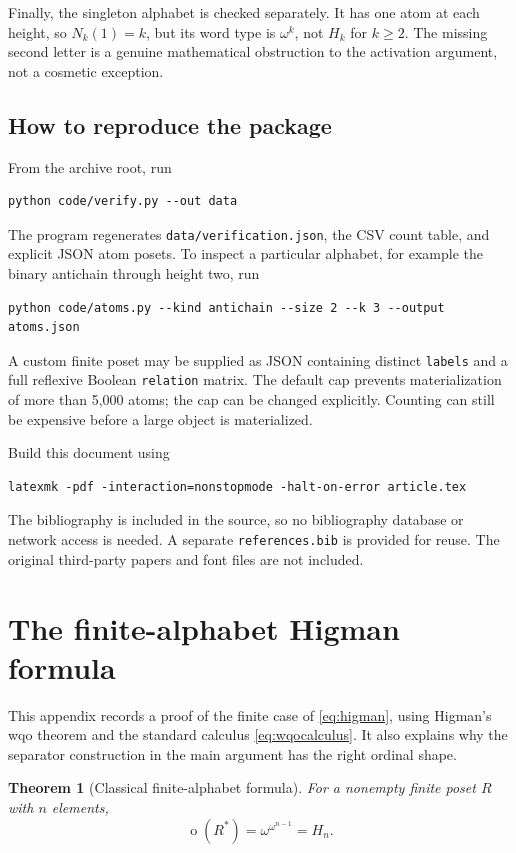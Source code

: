 \documentclass[11pt,letterpaper]{article}
\newtheorem{theorem}{Theorem}[section]
\theoremstyle{definition}
\theoremstyle{remark}
\newcommand{\otp}{\operatorname{o}}
\begin{document}
Finally, the singleton alphabet is checked separately. It has one atom
at each height, so $N_k(1)=k$, but its word type is $\omega^k$, not
$H_k$ for $k\ge2$. The missing second letter is a genuine mathematical
obstruction to the activation argument, not a cosmetic exception.

\subsection{How to reproduce the package}

From the archive root, run
\begin{lstlisting}
python code/verify.py --out data
\end{lstlisting}
The program regenerates \texttt{data/verification.json}, the CSV count
table, and explicit JSON atom posets. To inspect a particular alphabet,
for example the binary antichain through height two, run
\begin{lstlisting}
python code/atoms.py --kind antichain --size 2 --k 3 --output atoms.json
\end{lstlisting}
A custom finite poset may be supplied as JSON containing distinct
\texttt{labels} and a full reflexive Boolean \texttt{relation} matrix.
The default cap prevents materialization of more than 5,000 atoms; the
cap can be changed explicitly. Counting can still be expensive before
a large object is materialized.

Build this document using
\begin{lstlisting}
latexmk -pdf -interaction=nonstopmode -halt-on-error article.tex
\end{lstlisting}
The bibliography is included in the source, so no bibliography database
or network access is needed. A separate \texttt{references.bib} is
provided for reuse. The original third-party papers and font files are
not included.

\appendix
\section{The finite-alphabet Higman formula}\label{app:higman}

This appendix records a proof of the finite case of
\eqref{eq:higman}, using Higman's wqo theorem and the standard calculus
\eqref{eq:wqocalculus}. It also explains why the separator construction
in the main argument has the right ordinal shape.

\begin{theorem}[Classical finite-alphabet formula]
For a nonempty finite poset $R$ with $n$ elements,
\[
  \otp(R^*)=\omega^{\omega^{n-1}}=H_n.
\]
\end{theorem}
\end{document}
